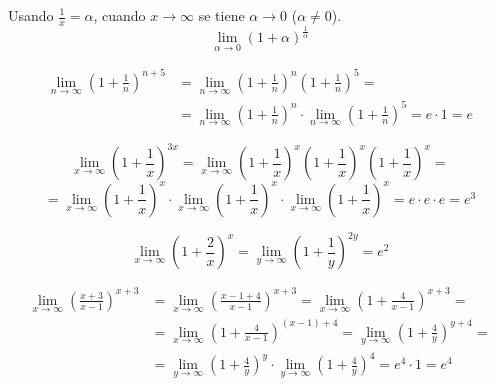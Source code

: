 

Usando \( \frac{1}{x} = \alpha \), cuando \( x \to \infty \) se tiene \( \alpha \to 0 \) (\( \alpha \ne 0 \)).
\[ \lim_{\alpha \to 0} (1 + \alpha)^{\frac{1}{\alpha}} \]


\begin{example}
  \begin{align*}
    \lim_{n \to \infty} \left( 1 + \frac{1}{n} \right)^{n + 5}
    & = \lim_{n \to \infty}
      \left( 1 + \frac{1}{n} \right)^n
      \left( 1 + \frac{1}{n} \right)^5 =
    \\ & =
    \lim_{n \to \infty} \left( 1 + \frac{1}{n} \right)^n
    \cdot \lim_{n \to \infty} \left( 1 + \frac{1}{n} \right)^5
    = e \cdot 1 = e
  \end{align*}
\end{example}


\begin{example}
  \[
    \lim_{x \to \infty} \left( 1 + \frac{1}{x} \right)^{3x}
    = \lim_{x \to \infty} \left( 1 + \frac{1}{x} \right)^x
                          \left( 1 + \frac{1}{x} \right)^x
                          \left( 1 + \frac{1}{x} \right)^x =
  \]
  \[
    = \lim_{x \to \infty} \left( 1 + \frac{1}{x} \right)^x \cdot
      \lim_{x \to \infty} \left( 1 + \frac{1}{x} \right)^x \cdot
      \lim_{x \to \infty} \left( 1 + \frac{1}{x} \right)^x
    = e \cdot e \cdot e = e^3
  \]
\end{example}


\begin{example}
  \[ \lim_{x \to \infty} \left( 1 + \frac{2}{x} \right)^x = \lim_{y \to \infty} \left( 1 + \frac{1}{y} \right)^{2y} = e^2 \]
\end{example}


\begin{example}
  \begin{align*}
    \lim_{x \to \infty} \left( \frac{x + 3}{x - 1} \right)^{x + 3} &
    = \lim_{x \to \infty} \left( \frac{x - 1 + 4}{x - 1} \right)^{x + 3}
    = \lim_{x \to \infty} \left( 1 + \frac{4}{x - 1} \right)^{x + 3} =
    \\ &
    = \lim_{x \to \infty} \left( 1 + \frac{4}{x - 1} \right)^{(x - 1) + 4}
    = \lim_{y \to \infty} \left( 1 + \frac{4}{y} \right)^{y + 4} =
    \\ &
    = \lim_{y \to \infty} \left( 1 + \frac{4}{y} \right)^{y}
      \cdot \lim_{y \to \infty} \left( 1 + \frac{4}{y} \right)^{4}
    = e^4 \cdot 1 = e^4
  \end{align*}
\end{example}




